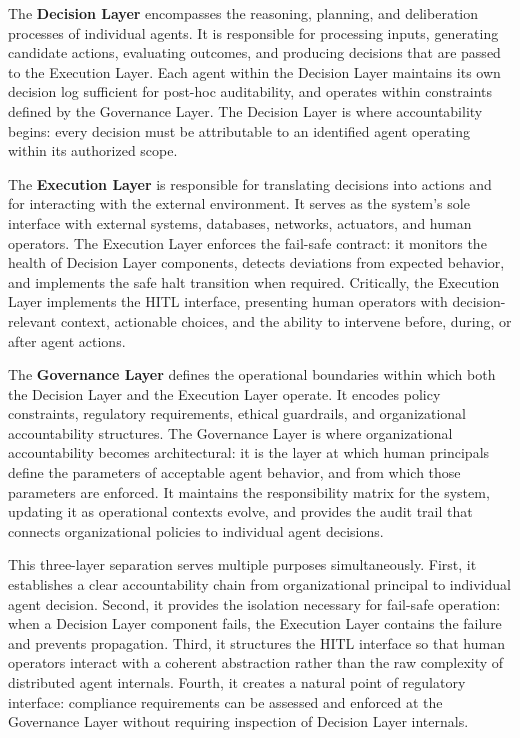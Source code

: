 The \textbf{Decision Layer} encompasses the reasoning, planning, and deliberation processes of individual agents. It is responsible for processing inputs, generating candidate actions, evaluating outcomes, and producing decisions that are passed to the Execution Layer. Each agent within the Decision Layer maintains its own decision log sufficient for post-hoc auditability, and operates within constraints defined by the Governance Layer. The Decision Layer is where accountability begins: every decision must be attributable to an identified agent operating within its authorized scope.

The \textbf{Execution Layer} is responsible for translating decisions into actions and for interacting with the external environment. It serves as the system's sole interface with external systems, databases, networks, actuators, and human operators. The Execution Layer enforces the fail-safe contract: it monitors the health of Decision Layer components, detects deviations from expected behavior, and implements the safe halt transition when required. Critically, the Execution Layer implements the HITL interface, presenting human operators with decision-relevant context, actionable choices, and the ability to intervene before, during, or after agent actions.

The \textbf{Governance Layer} defines the operational boundaries within which both the Decision Layer and the Execution Layer operate. It encodes policy constraints, regulatory requirements, ethical guardrails, and organizational accountability structures. The Governance Layer is where organizational accountability becomes architectural: it is the layer at which human principals define the parameters of acceptable agent behavior, and from which those parameters are enforced. It maintains the responsibility matrix for the system, updating it as operational contexts evolve, and provides the audit trail that connects organizational policies to individual agent decisions.

This three-layer separation serves multiple purposes simultaneously. First, it establishes a clear accountability chain from organizational principal to individual agent decision. Second, it provides the isolation necessary for fail-safe operation: when a Decision Layer component fails, the Execution Layer contains the failure and prevents propagation. Third, it structures the HITL interface so that human operators interact with a coherent abstraction rather than the raw complexity of distributed agent internals. Fourth, it creates a natural point of regulatory interface: compliance requirements can be assessed and enforced at the Governance Layer without requiring inspection of Decision Layer internals.


